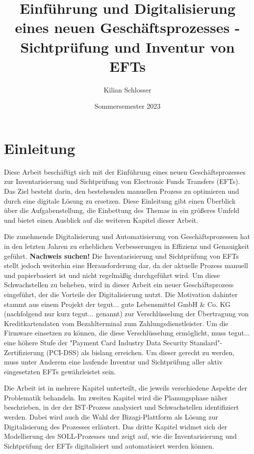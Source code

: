 \documentclass[12pt, a4paper]{article}
\title{Einführung und Digitalisierung eines neuen Geschäftsprozesses - Sichtprüfung und Inventur von EFTs}
\author{Kilian Schlosser}
\date{Sommersemester 2023}
\begin{document}
\maketitle


\tableofcontents
\newpage

\section{Einleitung}

Diese Arbeit beschäftigt sich mit der Einführung eines neuen Geschäftsprozesses zur Inventarisierung und Sichtprüfung von Electronic Funds Transfers (EFTs). 
Das Ziel besteht darin, den bestehenden manuellen Prozess zu optimieren und durch eine digitale Lösung zu ersetzen. Diese Einleitung gibt einen Überblick über die 
Aufgabenstellung, die Einbettung des Themas in ein größeres Umfeld und bietet einen Ausblick auf die weiteren Kapitel dieser Arbeit.

Die zunehmende Digitalisierung und Automatisierung von Geschäftsprozessen hat in den letzten Jahren zu erheblichen Verbesserungen in Effizienz und Genauigkeit geführt. \textbf{Nachweis suchen!}
Die Inventarisierung und Sichtprüfung von EFTs stellt jedoch weiterhin eine Herausforderung dar, da der aktuelle Prozess manuell und papierbasiert ist und nicht regelmäßig durchgeführt wird. 
Um diese Schwachstellen zu beheben, wird in dieser Arbeit ein neuer Geschäftsprozess eingeführt, der die Vorteile der Digitalisierung nutzt.
Die Motivation dahinter stammt aus einem Projekt der tegut... gute Lebensmittel GmbH \& Co. KG (nachfolgend nur kurz tegut... genannt) zur Verschlüsselung der Übertragung von
Kreditkartendaten vom Bezahlterminal zum Zahlungsdienstleister. Um die Firmware einsetzen zu können, die diese Verschlüsselung ermöglicht, muss tegut... eine höhere Stufe der 
"Payment Card Industry Data Security Standard"-Zertifizierung (PCI-DSS) als bislang erreichen. Um dieser gerecht zu werden, muss unter Anderem eine laufende Inventur und
Sichtprüfung aller aktiv eingesetzten EFTs gewährleistet sein. 

Die Arbeit ist in mehrere Kapitel unterteilt, die jeweils verschiedene Aspekte der Problematik behandeln. Im zweiten Kapitel wird die Planungsphase näher beschrieben, 
in der der IST-Prozess analysiert und Schwachstellen identifiziert werden. Dabei wird auch die Wahl der Bizagi-Plattform als Lösung zur Digitalisierung des Prozesses erläutert. 
Das dritte Kapitel widmet sich der Modellierung des SOLL-Prozesses und zeigt auf, wie die Inventarisierung und Sichtprüfung der EFTs digitalisiert und automatisiert werden 
können.
\end{document}
